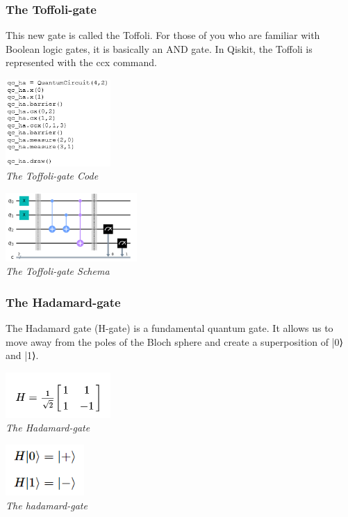 \documentclass{article}
\begin{document}
\subsubsection{The Toffoli-gate} 
This new gate is called the Toffoli. For those of you who are familiar with Boolean logic gates, it is basically an AND gate.
In Qiskit, the Toffoli is represented with the ccx command.
\begin{mdframed}
\begin{center}
\begin{minipage}[b]{4cm}
\centering
\includegraphics[width=4cm]{toffoli_code.png}\\\textit{The Toffoli-gate Code}
\end{minipage}
\begin{minipage}[b]{5cm}
\centering
\includegraphics[width=5cm]{toffoli_schema.png}\\\textit{The Toffoli-gate Schema}
\end{minipage}
\end{center}
\end{mdframed}
\subsubsection{The Hadamard-gate} 
The Hadamard gate (H-gate) is a fundamental quantum gate. It allows us to move away from the poles of the Bloch sphere and create a superposition of |0⟩ and |1⟩. 
\begin{mdframed}
\begin{center}
\begin{minipage}[b]{4cm}
\centering
\includegraphics[width=4cm]{hadamard_gate.png}\\\textit{The Hadamard-gate}
\end{minipage}
\begin{minipage}[b]{5cm}
\centering
\includegraphics[width=3cm]{hadamard_gate_transformation.png}\\\textit{The hadamard-gate}
\end{minipage}
\end{center}
\end{mdframed}
\newpage
\end{document}
